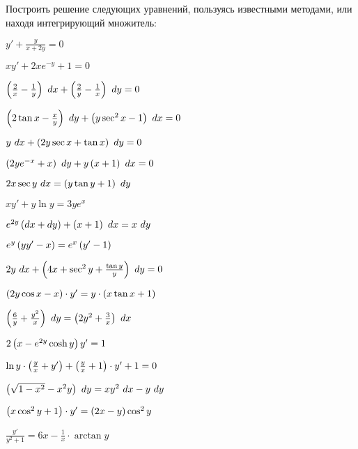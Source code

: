 	Построить решение следующих уравнений, пользуясь известными методами, или находя интегрирующий множитель:

	\begin{multicols}{2}
		\begin{enumtasks}

			\label{firstorder:intfactor}
			\item \( y' + \frac{y}{x + 2y} = 0 \) 																%
			\item \( xy' + 2xe^{-y} + 1 = 0 \) 																	%
			\item \( \left( \frac{2}{x} - \frac{1}{y} \right) ~ dx + \left( \frac{2}{y} - \frac{1}{x} \right) ~ dy = 0 \) 	%
			\item \( \left( 2 \tan{x} - \frac{x}{y} \right) ~ dy + \left( y \sec^2 {x} - 1 \right) ~ dx = 0 \) 				%
			\item \( y ~ dx + \left( 2y \sec{x} + \tan{x} \right) ~ dy = 0 \) 											%
			\item \( \left( 2y e^{-x} + x \right) ~ dy + y\left( x + 1 \right) ~ dx = 0 \) 									%
			\item \( 2x\sec{y} ~ dx = \left( y \tan{y} + 1 \right) ~ dy \) 											%
			\item \( xy' + y \ln{y} = 3ye^{x} \) 																%
			\item \( e^{2y} \left( dx + dy \right) + \left( x + 1 \right) ~ dx = x ~ dy \) 									%
			\item \( e^{y} \left( yy' - x \right) = e^{x} \left( y' - 1 \right) \) 											%
			\item \( 2y ~ dx + \left( 4x + \sec^2{y} + \frac{\tan{y}}{y} \right) ~ dy = 0 \) 							%
			\item \( \left( 2y \cos{x} - x \right) \cdot y' = y \cdot \left( x\tan{x} + 1 \right) \) 							%
			\item \( \left( \frac{6}{y} + \frac{y^2}{x} \right) ~ dy = \left( 2y^2 + \frac{3}{x} \right) ~ dx \) 				%
			\item \( 2 \left( x - e^{2y} \cosh{y} \right) y' = 1 \) 													%
			\item \( \ln{y} \cdot \left( \frac{y}{x} + y' \right) + \left( \frac{y}{x} + 1 \right) \cdot y' + 1 = 0 \) 		%
			\item \( \left( \sqrt{1 - x^2} - x^2 y \right) ~ dy = xy^2 ~ dx - y ~ dy \) 								%
			\item \( \left( x \cos^2{y} + 1 \right) \cdot y' = \left( 2x - y \right) \cos^2{y} \) 							%
			\item \( \frac{y'}{y^2 + 1} = 6x - \frac{1}{x} \cdot \arctan{y} \) 									%
	

\end{enumtasks}
\end{multicols}
